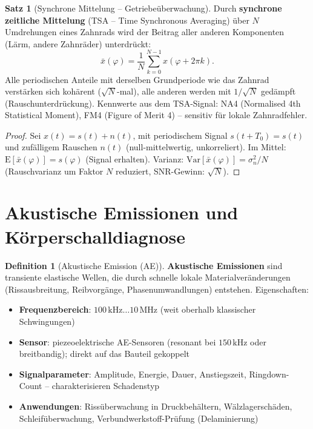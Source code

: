 ﻿\documentclass[a4paper,12pt]{report}
\theoremstyle{definition}
\newtheorem{definition}{Definition}
\newtheorem{satz}{Satz}
\begin{document}
\begin{satz}[Synchrone Mittelung -- Getriebeüberwachung]
Durch \textbf{synchrone zeitliche Mittelung} (TSA -- Time Synchronous Averaging)
über $N$ Umdrehungen eines Zahnrads wird der Beitrag aller anderen
Komponenten (Lärm, andere Zahnräder) unterdrückt:
\[
  \bar{x}(\varphi) = \frac{1}{N}\sum_{k=0}^{N-1} x(\varphi + 2\pi k).
\]
Alle periodischen Anteile mit derselben Grundperiode wie das Zahnrad
verstärken sich kohärent ($\sqrt{N}$-mal), alle anderen werden
mit $1/\sqrt{N}$ gedämpft (Rauschunterdrückung).
Kennwerte aus dem TSA-Signal: NA4 (Normalised 4th Statistical Moment),
FM4 (Figure of Merit 4) -- sensitiv für lokale Zahnradfehler.
\end{satz}
\begin{proof}
Sei $x(t) = s(t) + n(t)$, mit periodischem Signal $s(t+T_0) = s(t)$
und zufälligem Rauschen $n(t)$ (null-mittelwertig, unkorreliert).
Im Mittel:
$\mathrm{E}[\bar{x}(\varphi)] = s(\varphi)$ (Signal erhalten).
Varianz: $\mathrm{Var}[\bar{x}(\varphi)] = \sigma_n^2/N$
(Rauschvarianz um Faktor $N$ reduziert, SNR-Gewinn: $\sqrt{N}$).
\end{proof}

\section{Akustische Emissionen und Körperschalldiagnose}

\begin{definition}[Akustische Emission (AE)]
\textbf{Akustische Emissionen} sind transiente elastische Wellen,
die durch schnelle lokale Materialveränderungen (Rissausbreitung,
Reibvorgänge, Phasenumwandlungen) entstehen.
Eigenschaften:
\begin{itemize}
    \item[-] \textbf{Frequenzbereich}: $100\,\mathrm{kHz}\ldots10\,\mathrm{MHz}$
          (weit oberhalb klassischer Schwingungen)
    \item[-] \textbf{Sensor}: piezeoelektrische AE-Sensoren (resonant bei
          $150\,\mathrm{kHz}$ oder breitbandig); direkt auf das Bauteil gekoppelt
    \item[-] \textbf{Signalparameter}: Amplitude, Energie, Dauer, Anstiegszeit,
          Ringdown-Count -- charakterisieren Schadenstyp
    \item[-] \textbf{Anwendungen}: Rissüberwachung in Druckbehältern,
          Wälzlagerschäden, Schleifüberwachung, Verbundwerkstoff-Prüfung (Delaminierung)
\end{itemize}
\end{definition}
\end{document}
